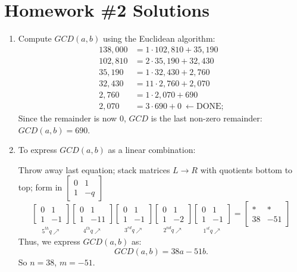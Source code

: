 \section{Homework \#2 Solutions}
\begin{enumerate}
    \item Compute $GCD(a, b)$ using the Euclidean algorithm:
          \begin{align*}
              138,000 &= 1 \cdot 102,810 + 35,190 \\
              102,810 &= 2 \cdot 35,190 + 32,430 \\
              35,190 &= 1 \cdot 32,430 + 2,760 \\
              32,430 &= 11 \cdot 2,760 + 2,070 \\
              2,760 &= 1 \cdot 2,070 + 690 \\
              2,070 &= 3 \cdot 690 + 0 \ \leftarrow \text{DONE;}
          \end{align*}
          Since the remainder is now $0$, $GCD$ is the last non-zero remainder: $GCD(a, b) = 690.$


    \item To express $GCD(a, b)$ as a linear combination:
    
    Throw away last equation; stack matrices $L\rightarrow R$ with quotients bottom to top; form in $\begin{bmatrix} 0 & 1 \\ 1 & -q \end{bmatrix}$
          \[
          \underset{\substack{5^{th} q \nearrow  }}{\begin{bmatrix} 0 & 1 \\ 1 & -1 \end{bmatrix}}
          \underset{\substack{4^{th} q \nearrow  }}{\begin{bmatrix} 0 & 1 \\ 1 & -11 \end{bmatrix}}
          \underset{\substack{3^{rd} q \nearrow  }}{\begin{bmatrix} 0 & 1 \\ 1 & -1 \end{bmatrix}}
          \underset{\substack{2^{nd} q \nearrow  }}{\begin{bmatrix} 0 & 1 \\ 1 & -2 \end{bmatrix}}
          \underset{\substack{1^{st} q \nearrow  }}{\begin{bmatrix} 0 & 1 \\ 1 & -1 \end{bmatrix}}
          = 
          \begin{bmatrix} * & * \\ 38 & -51 \end{bmatrix}
          \]
          Thus, we express $GCD(a, b)$ as:
          \[
          GCD(a, b) = 38a - 51b.
          \]
          So $n = 38$, $m = -51$.


\end{enumerate}
